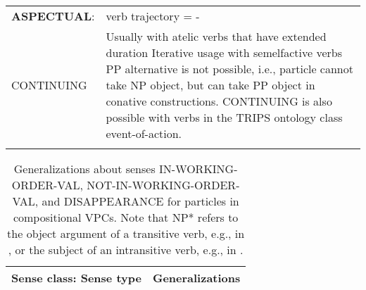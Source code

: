 \documentclass[output=paper,modfonts,nonflat]{langsci/langscibook}
\begin{document}
\begin{table}
\begin{tabularx}{\textwidth}{p{30mm}Q}
\tablevspace
  \textbf{ASPECTUAL}:& verb trajectory = -  \\
   CONTINUING
   &   Usually with atelic verbs that have extended duration \newline Iterative usage with semelfactive verbs \newline PP alternative is not possible, i.e., particle cannot take NP object, but can take PP object in conative constructions. \newline CONTINUING is also possible with verbs in the TRIPS ontology class event-of-action.\\ 
  \lspbottomrule
 \end{tabularx}%
\end{table}

\begin{table}%
\caption{Generalizations about senses IN-WORKING-ORDER-VAL, NOT-IN-WORKING-ORDER-VAL, and DISAPPEARANCE for particles in compositional VPCs. Note that NP* refers to the object argument of a transitive verb, e.g.,  in , or the subject of an intransitive verb, e.g.,  in .}
\label{tab:1:findings-prtcls-3senses}
\footnotesize
 \begin{tabularx}{\textwidth}{p{45mm}Q}
  \lsptoprule
   \textbf{Sense class}: \newline Sense type
        & Generalizations\\
    \midrule


\end{tabularx}
\end{table}
\end{document}
